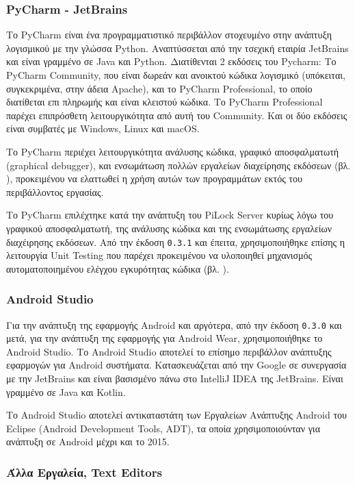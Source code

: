  		\subsubsection{PyCharm - JetBrains}
 			Το PyCharm είναι ένα προγραμματιστικό περιβάλλον στοχευμένο στην ανάπτυξη λογισμικού με την γλώσσα Python. Αναπτύσσεται από την τσεχική εταιρία JetBrains και είναι γραμμένο σε Java και Python. Διατίθενται 2 εκδόσεις του Pycharm: Το PyCharm Community, που είναι δωρεάν και ανοικτού κώδικα λογισμικό (υπόκειται, συγκεκριμένα, στην άδεια Apache), και το PyCharm Professional, το οποίο διατίθεται επι πληρωμής και είναι κλειστού κώδικα. Το PyCharm Professional παρέχει επιπρόσθετη λειτουργικότητα από αυτή του Community. Και οι δύο εκδόσεις είναι συμβατές με Windows, Linux και macOS.

 			Το PyCharm περιέχει λειτουργικότητα ανάλυσης κώδικα, γραφικό αποσφαλματωτή (graphical debugger), και ενσωμάτωση πολλών εργαλείων διαχείρησης εκδόσεων (βλ. ), προκειμένου να ελαττωθεί η χρήση αυτών των προγραμμάτων εκτός του περιβάλλοντος εργασίας.

 			Το PyCharm επιλέχτηκε κατά την ανάπτυξη του PiLock Server κυρίως λόγω του γραφικού αποσφαλματωτή, της ανάλυσης κώδικα και της ενσωμάτωσης εργαλείων διαχέιρησης εκδόσεων. Από την έκδοση \verb|0.3.1| και έπειτα, χρησιμοποιήθηκε επίσης η λειτουργία Unit Testing που παρέχει προκειμένου να υλοποιηθεί μηχανισμός αυτοματοποιημένου ελέγχου εγκυρότητας κώδικα (βλ. ).

 		\subsubsection{Android Studio}
 			Για την ανάπτυξη της εφαρμογής Android και αργότερα, από την έκδοση \verb|0.3.0| και μετά, για την ανάπτυξη της εφαρμογής για Android Wear, χρησιμοποιήθηκε το Android Studio. Το Android Studio αποτελεί το επίσημο περιβάλλον ανάπτυξης εφαρμογών για Android συστήματα. Κατασκευάζεται από την Google σε συνεργασία με την JetBrains και είναι βασισμένο πάνω στο IntelliJ IDEA της JetBrains. Είναι γραμμένο σε Java και Kotlin.

 			Το Android Studio αποτελεί αντικαταστάτη των Εργαλείων Ανάπτυξης Android του Eclipse (Android Development Tools, ADT), τα οποία χρησιμοποιούνταν για ανάπτυξη σε Android μέχρι και το 2015.

 		\subsubsection{Άλλα Εργαλεία, Text Editors}

